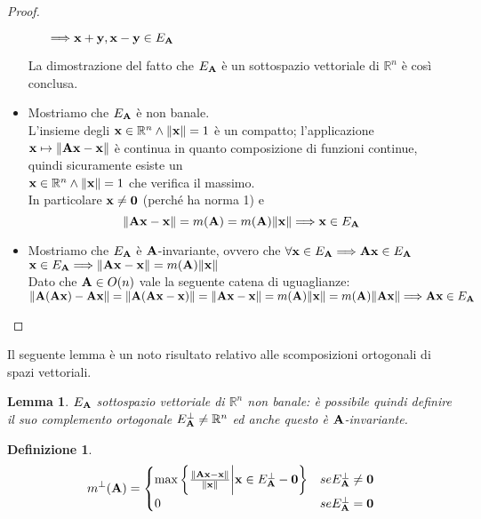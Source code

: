 \documentclass[a4paper]{book}
\newtheorem{definition}{Definizione}[section]
\newtheorem{lemma}[theorem]{Lemma}
\begin{document}
\begin{proof}
\begin{itemize}
\begin{itemize}
$\Longrightarrow \vb{x+y, x-y} \in E_{\vb{A}} $ 
\end{itemize}  
La dimostrazione del fatto che $E_{\vb{A}}$ è un sottospazio vettoriale di $\mathbb{R}^n $ è così conclusa.
\item Mostriamo che $E_{\vb{A}}$ è non banale.\\
L'insieme degli $\vb{x} \in \mathbb{R}^{n} \land \norm{\vb{x}} = 1$ è un compatto; l'applicazione $ \vb{x} \mapsto \norm{\vb{Ax-x}}$ è continua in quanto composizione di funzioni continue, quindi sicuramente esiste un \\ $\vb{x} \in \mathbb{R}^{n} \land \norm{\vb{x}} = 1$  che  verifica il massimo. \\
In particolare $\vb{x} \neq \vb{0}$  (perché ha norma 1) e 
\[ \norm{\vb{Ax - x}} = m(\vb{A}) = m(\vb{A})\norm{\vb{x}} \Longrightarrow \vb{x} \in E_{\vb{A}}\]
\item Mostriamo che $E_{\vb{A}}$ è $\vb{A}$-invariante, ovvero che  $\forall \vb{x} \in E_{\vb{A}} \Longrightarrow \vb{Ax} \in E_{\vb{A}}$ \\
$\vb{x} \in E_{\vb{A}} \Longrightarrow \norm{\vb{Ax-x}} = m(\vb{A})\norm{\vb{x}} $ \\
Dato che $\vb{A} \in O(n)$ vale la seguente catena di uguaglianze:\\
$ \norm{\vb{A(Ax) - Ax }} =  \norm{\vb{A(Ax-x)}} = \norm{\vb{Ax - x}} = m(\vb{A})\norm{\vb{x}} = m(\vb{A})\norm{\vb{Ax}} \Longrightarrow \vb{Ax} \in E_{\vb{A}}$
\end{itemize} 
\end{proof}
Il seguente lemma è un noto risultato relativo alle scomposizioni ortogonali di spazi vettoriali. 
\begin{lemma}
$E_{\vb{A}}$ sottospazio vettoriale di $\mathbb{R}^n $ non banale: è possibile quindi definire il suo complemento ortogonale $E^{\perp}_{\vb{A}} \neq \mathbb{R}^n$ ed anche questo è $\vb{A}$-invariante. 
\end{lemma} 

\begin{definition}

\[ m^{\perp}(\vb{A}) = \begin{cases} 
      \max \bigg\{ \frac{\norm{\vb{Ax-x}}}{\norm{\vb{x}}} \bigg|  \vb{x} \in E^{\perp}_{\vb{A}} - \vb{0} \bigg\}  &  se   E^{\perp}_{\vb{A}} \neq {\vb{0}} \\
      0 & se   E^{\perp}_{\vb{A}} = {\vb{0}} \\
      
   \end{cases}
\]

\end{definition}
\end{document}
